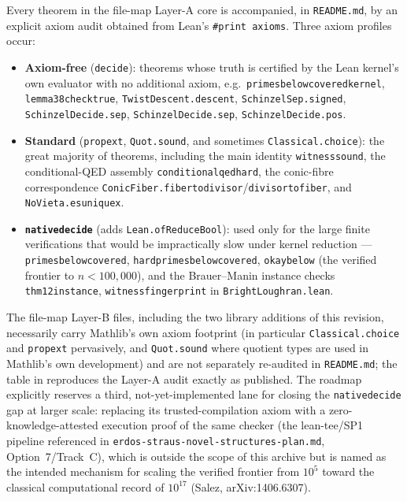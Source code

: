 \documentclass[11pt]{article}
\theoremstyle{plain}
\theoremstyle{definition}
\theoremstyle{remark}
\newcommand{\file}[1]{\texttt{#1}}
\newcommand{\lean}[1]{\texttt{#1}}
\renewcommand{\_}{\textunderscore\allowbreak}
\begin{document}
Every theorem in the file-map Layer-A core is accompanied, in \file{README.md}, by an explicit
axiom audit obtained from Lean's \texttt{\#print axioms}. Three axiom profiles occur:
\begin{itemize}[leftmargin=1.4em]
  \item \textbf{Axiom-free} (\texttt{decide}): theorems whose truth is certified by the Lean
        kernel's own evaluator with no additional axiom, e.g.\ \lean{primes\_below\_100\_covered\_kernel},
        \lean{lemma38\_check\_true}, \lean{TwistDescent.descent}, \lean{SchinzelSep.signed\_9\_5},
        \lean{SchinzelDecide.sep\_9\_5}, \lean{SchinzelDecide.sep\_13\_7}, \lean{SchinzelDecide.pos\_4\_5}.
  \item \textbf{Standard} (\texttt{propext}, \texttt{Quot.sound}, and sometimes
        \texttt{Classical.choice}): the great majority of theorems, including the main identity
        \lean{witness\_sound}, the conditional-QED assembly \lean{conditional\_qed\_hard}, the
        conic-fibre correspondence \lean{ConicFiber.fiber\_to\_divisor}/\lean{divisor\_to\_fiber},
        and \lean{NoVieta.es\_unique\_x}.
  \item \textbf{\texttt{native\_decide}} (adds \texttt{Lean.ofReduceBool}): used only for the
        large finite verifications that would be impractically slow under kernel reduction —
        \lean{primes\_below\_10000\_covered}, \lean{hard\_primes\_below\_10000\_covered},
        \lean{okay\_below\_100000} (the verified frontier to $n<100{,}000$), and the
        Brauer--Manin instance checks \lean{thm12\_instance\_1009},
        \lean{witness\_fingerprint\_1009} in \file{BrightLoughran.lean}.
\end{itemize}
The file-map Layer-B files, including the two library additions of this revision, necessarily
carry Mathlib's own axiom footprint (in particular \texttt{Classical.choice} and
\texttt{propext} pervasively, and \texttt{Quot.sound} where quotient types are used in Mathlib's
own development) and are not separately re-audited in \file{README.md}; the table in
 reproduces the Layer-A audit exactly as published. The roadmap explicitly
reserves a third, not-yet-implemented lane for closing the \texttt{native\_decide} gap at
larger scale: replacing its trusted-compilation axiom with a zero-knowledge-attested execution
proof of the same checker (the lean-tee/SP1 pipeline referenced in
\texttt{erdos-\allowbreak straus-\allowbreak novel-\allowbreak structures-\allowbreak plan.md}, Option~7/Track~C), which is outside
the scope of this archive but is named as the intended mechanism for scaling the verified
frontier from $10^5$ toward the classical computational record of $10^{17}$ (Salez,
arXiv:1406.6307).
\end{document}
